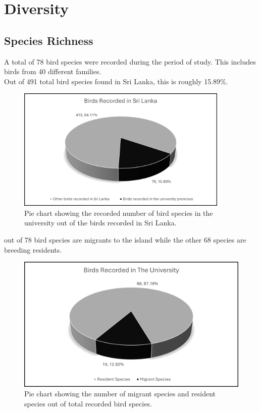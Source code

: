 \chapter{Diversity}
\label{cp:Diversity}

\section{Species Richness}
A total of 78 bird species were recorded during the period of study. This includes birds from 40 different families.\\
Out of 491 total bird species found in Sri Lanka, this is roughly 15.89\%.

\begin{figure}[!htpb]
    \centering
    \includegraphics[width=0.9\textwidth]{Figures/pieChart1.png}
    \caption[]{Pie chart showing the recorded number of bird species in the university out of the birds recorded in Sri Lanka.}
    \label{fig:figure-01}
\end{figure}
 out of 78 bird species are migrants to the island while the other 68 species are breeding residents. 

\begin{figure}[!htpb]
    \centering
    \includegraphics[width=\linewidth]{Figures/pieChart2.png}
    \caption[]{Pie chart showing the number of migrant species and resident species out of total recorded bird species.}
    \label{fig:figure-01}
\end{figure}
